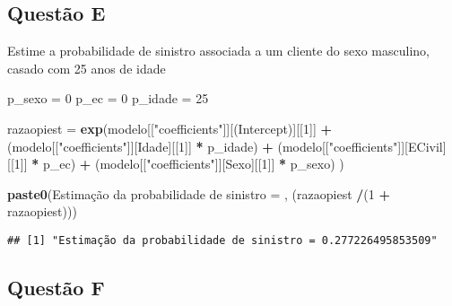 \documentclass[
]{article}
\newenvironment{Shaded}{\begin{snugshade}}{\end{snugshade}}
\newcommand{\DecValTok}[1]{\textcolor[rgb]{0.00,0.00,0.81}{#1}}
\newcommand{\FunctionTok}[1]{\textcolor[rgb]{0.13,0.29,0.53}{\textbf{#1}}}
\newcommand{\NormalTok}[1]{#1}
\newcommand{\OtherTok}[1]{\textcolor[rgb]{0.56,0.35,0.01}{#1}}
\newcommand{\SpecialCharTok}[1]{\textcolor[rgb]{0.81,0.36,0.00}{\textbf{#1}}}
\newcommand{\StringTok}[1]{\textcolor[rgb]{0.31,0.60,0.02}{#1}}
\begin{document}
\hypertarget{questuxe3o-e-1}{%
\subsection{Questão E}\label{questuxe3o-e-1}}

Estime a probabilidade de sinistro associada a um cliente do sexo
masculino, casado com 25 anos de idade

\begin{Shaded}
\begin{Highlighting}[]
\NormalTok{p\_sexo }\OtherTok{=} \DecValTok{0}
\NormalTok{p\_ec }\OtherTok{=} \DecValTok{0}
\NormalTok{p\_idade }\OtherTok{=} \DecValTok{25}

\NormalTok{razaopiest }\OtherTok{=} \FunctionTok{exp}\NormalTok{(modelo[[}\StringTok{"coefficients"}\NormalTok{]][}\StringTok{\textquotesingle{}(Intercept)\textquotesingle{}}\NormalTok{][[}\DecValTok{1}\NormalTok{]] }\SpecialCharTok{+} 
\NormalTok{                 (modelo[[}\StringTok{"coefficients"}\NormalTok{]][}\StringTok{\textquotesingle{}Idade\textquotesingle{}}\NormalTok{][[}\DecValTok{1}\NormalTok{]] }\SpecialCharTok{*}\NormalTok{ p\_idade) }\SpecialCharTok{+}
\NormalTok{                 (modelo[[}\StringTok{"coefficients"}\NormalTok{]][}\StringTok{\textquotesingle{}ECivil\textquotesingle{}}\NormalTok{][[}\DecValTok{1}\NormalTok{]] }\SpecialCharTok{*}\NormalTok{ p\_ec) }\SpecialCharTok{+}
\NormalTok{                 (modelo[[}\StringTok{"coefficients"}\NormalTok{]][}\StringTok{\textquotesingle{}Sexo\textquotesingle{}}\NormalTok{][[}\DecValTok{1}\NormalTok{]] }\SpecialCharTok{*}\NormalTok{ p\_sexo)}
\NormalTok{                 )}

\FunctionTok{paste0}\NormalTok{(}\StringTok{\textquotesingle{}Estimação da probabilidade de sinistro = \textquotesingle{}}\NormalTok{,}
\NormalTok{       (razaopiest }\SpecialCharTok{/}\NormalTok{(}\DecValTok{1} \SpecialCharTok{+}\NormalTok{ razaopiest)))}
\end{Highlighting}
\end{Shaded}

\begin{verbatim}
## [1] "Estimação da probabilidade de sinistro = 0.277226495853509"
\end{verbatim}

\hypertarget{questuxe3o-f-1}{%
\subsection{Questão F}\label{questuxe3o-f-1}}
\end{document}
